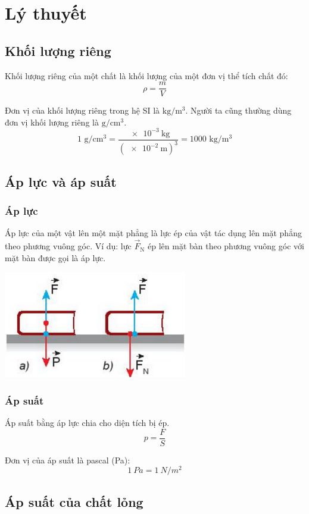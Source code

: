 \setcounter{section}{0}
\section{Lý thuyết}
\subsection{Khối lượng riêng}
Khối lượng riêng của một chất là khối lượng của một đơn vị thể tích chất đó:
$$\rho = \dfrac{m}{V}$$

Đơn vị của khối lượng riêng trong hệ SI là $\text{kg}/\text{m}^3$. Người ta cũng thường dùng đơn vị khối lượng riêng là $\text{g}/\text{cm}^3$.
$$1\text{ g}/\text{cm}^3= \dfrac{\SI{e-3}{\kilogram}}{(\SI{e-2}{\meter})^3}= 1000 \text{ kg}/\text{m}^3$$


\subsection{Áp lực và áp suất}
\subsubsection{Áp lực}
Áp lực của một vật lên một mặt phẳng là lực ép của vật tác dụng lên mặt phẳng theo phương vuông góc. Ví dụ: lực $\vec F_\text{N}$ ép lên mặt bàn theo phương vuông góc với mặt bàn được gọi là áp lực.
\begin{center}
	\includegraphics[scale=0.6]{../figs/G10-029-1}
\end{center}
\subsubsection{Áp suất}
Áp suất bằng áp lực chia cho diện tích bị ép.
$$p = \dfrac{F}{S}$$

Đơn vị của áp suất là pascal (Pa):
$$\SI{1}{Pa} = \SI{1}{N/m^2}$$

\subsection{Áp suất của chất lỏng}
